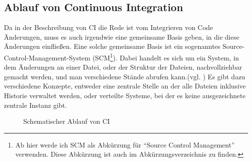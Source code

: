 \subsection{Ablauf von Continuous Integration}
Da in der Beschreibung von CI die Rede ist vom Integrieren von Code Änderungen, muss es auch irgendwie eine gemeinsame Basis geben, in die diese Änderungen einfließen. Eine solche gemeinsame Basis ist ein sogenanntes Source-Control-Management-System (SCM\footnote{Ab hier werde ich SCM als Abkürzung für "`Source Control Management"' verwenden. Diese Abkürzung ist auch im Abkürzungsverzeichnis zu finden.}). Dabei handelt es sich um ein System, in dem Änderungen an einer Datei, oder der Struktur der Dateien, nachvollziehbar gemacht werden, und man verschiedene Stände abrufen kann.(vgl. \cite{fowler-CI}) Es gibt dazu verschiedene Konzepte, entweder eine zentrale Stelle an der alle Dateien inklusive Historie verwaltet werden, oder verteilte Systeme, bei der es keine ausgezeichnete zentrale Instanz gibt.\\
\begin{figure}[h]
  \centering
  \caption{Schematischer Ablauf von CI}\label{fig:Schema-aufbau}
\end{figure}
